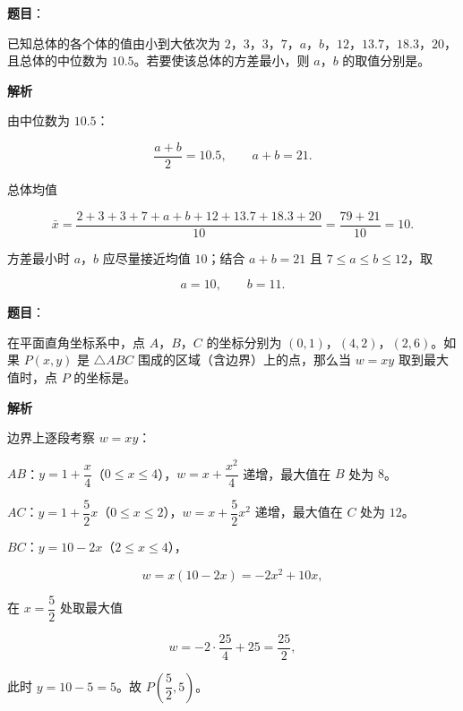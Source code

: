 \begin{answer}

\textbf{题目}：

已知总体的各个体的值由小到大依次为 $2$，$3$，$3$，$7$，$a$，$b$，$12$，$13.7$，$18.3$，$20$，且总体的中位数为 $10.5$。若要使该总体的方差最小，则 $a$，$b$ 的取值分别是\gkblank{}。

\textbf{解析}

由中位数为 $10.5$：

\nopagebreak[4]
\[\frac{a+b}2=10.5,\qquad a+b=21.\]

总体均值

\nopagebreak[4]
\[\bar x=\frac{2+3+3+7+a+b+12+13.7+18.3+20}{10}=\frac{79+21}{10}=10.\]

方差最小时 $a$，$b$ 应尽量接近均值 $10$；结合 $a+b=21$ 且 $7\leqslant a\leqslant b\leqslant12$，取

\nopagebreak[4]
\[a=10,\qquad b=11.\]


\end{answer}
\begin{answer}

\textbf{题目}：

在平面直角坐标系中，点 $A$，$B$，$C$ 的坐标分别为 $(0,1)$，$(4,2)$，$(2,6)$。如果 $P(x,y)$ 是 $\triangle ABC$ 围成的区域（含边界）上的点，那么当 $w=xy$ 取到最大值时，点 $P$ 的坐标是\gkblank{}。

\textbf{解析}

边界上逐段考察 $w=xy$：

$AB$：$y=1+\dfrac x4$（$0\leqslant x\leqslant4$），$w=x+\dfrac{x^2}4$ 递增，最大值在 $B$ 处为 $8$。

$AC$：$y=1+\dfrac52x$（$0\leqslant x\leqslant2$），$w=x+\dfrac52x^2$ 递增，最大值在 $C$ 处为 $12$。

$BC$：$y=10-2x$（$2\leqslant x\leqslant4$），

\nopagebreak[4]
\[w=x(10-2x)=-2x^2+10x,\]

在 $x=\dfrac52$ 处取最大值

\nopagebreak[4]
\[w=-2\cdot\frac{25}4+25=\frac{25}2,\]

此时 $y=10-5=5$。故 $P\left(\dfrac52,5\right)$。


\end{answer}
